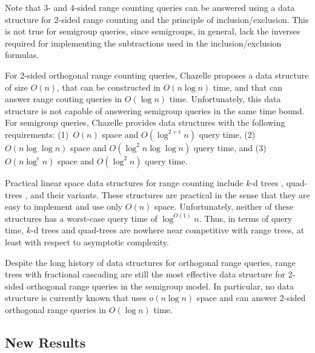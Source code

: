 \documentclass{patmorin}
\begin{document}
Note that 3- and 4-sided range counting queries can be answered
using a data structure for 2-sided range counting and the principle of
inclusion/exclusion.  This is not true for semigroup queries, since 
semigroups, in general, lack the inverses required for implementing the
subtractions used in the inclusion/exclusion formulas.

For 2-sided orthogonal range counting queries, Chazelle
\cite{ae55,ae58} proposes a data structure of size $O(n)$, that can be
constructed in $O(n\log n)$ time, and that can answer range couting
queries in $O(\log n)$ time.  Unfortunately, this data structure is
not capable of answering semigroup queries in the same time bound.
For semigroup queries, Chazelle provides data structures with the
following requirements: (1)~$O(n)$ space and $O(\log^{2+\epsilon} n)$
query time, (2)~$O(n\log\log n)$ space and $O(\log^{2}n\log\log n)$
query time, and (3)~$O(n\log^\epsilon n)$ space and $O(\log^2 n)$
query time.

Practical linear space data structures for range counting include
$k$-d trees \cite{ae41}, quad-trees \cite{ae251}, and their
variants.  These structures are practical in the sense that they are
easy to implement and use only $O(n)$ space.  Unfortunately, neither
of these structures has a worst-case query time of $\log^{O(1)} n$.
Thus, in terms of query time, $k$-d trees and quad-trees are nowhere
near competitive with range trees, at least with respect to asymptotic
complexity.


Despite the long history of data structures for orthogonal range
queries, range trees with fractional cascading are still the most
effective data structure for 2-sided orthogonal range queries in the
semigroup model.  In particular, no data structure is currently known
that uses $o(n\log n)$ space and can answer 2-sided orthogonal range
queries in $O(\log n)$ time. 

\subsection{New Results}
\end{document}

